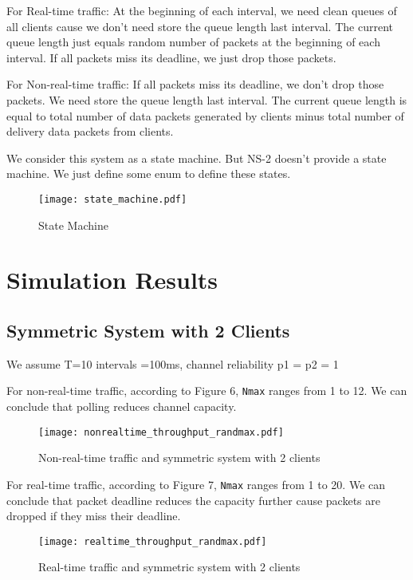 \documentclass{article}
\begin{document}
For Real-time traffic: At the beginning of each interval, we need clean queues of all clients cause we don't need store the queue length last interval. The current queue length just equals random number of packets at the beginning of each interval. If all packets miss its deadline, we just drop those packets.

For Non-real-time traffic:  If all packets miss its deadline, we don't drop those packets. We need store the queue length last interval. The current queue length is equal to total number of data packets generated by clients minus total number of delivery data packets from clients. 

We consider this system as a state machine. But NS-2 doesn't provide a state machine. We just define some enum to define these states. 

\begin{figure}[H]
\centering
\texttt{[image: state\_machine.pdf]}
\caption{State Machine}
\end{figure}


\section{Simulation Results}
\label{section: simulation}
\subsection{Symmetric System with 2 Clients}
We assume T=10 intervals =100ms, channel reliability p1 = p2 = 1

For non-real-time traffic, according to Figure 6, \lstinline |Nmax| ranges from 1 to 12. We can conclude that polling reduces channel capacity. 

\begin{figure}[H]
\centering
\texttt{[image: nonrealtime\_throughput\_randmax.pdf]}
\caption{Non-real-time traffic and symmetric system with 2 clients}
\end{figure}

For real-time traffic, according to Figure 7, \lstinline |Nmax| ranges from 1 to 20. We can conclude that packet deadline reduces the capacity further cause packets are dropped if they miss their deadline. 

\begin{figure}[H]
\centering
\texttt{[image: realtime\_throughput\_randmax.pdf]}
\caption{Real-time traffic and symmetric system with 2 clients}
\end{figure}
\end{document}
